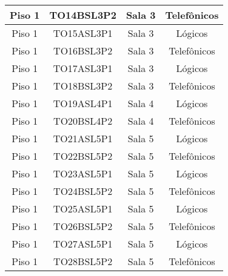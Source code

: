 \begin{table}[]
\begin{tabular}{cccc}
		Piso 1 & TO14BSL3P2                                                     & Sala 3         & Telefônicos        \\ \hline
		Piso 1 & TO15ASL3P1                                                     & Sala 3         & Lógicos            \\ \hline
		Piso 1 & TO16BSL3P2                                                     & Sala 3         & Telefônicos        \\ \hline
		Piso 1 & TO17ASL3P1                                                     & Sala 3         & Lógicos            \\ \hline
		Piso 1 & TO18BSL3P2                                                     & Sala 3         & Telefônicos        \\ \hline
		Piso 1 & TO19ASL4P1                                                     & Sala 4         & Lógicos            \\ \hline
		Piso 1 & TO20BSL4P2                                                     & Sala 4         & Telefônicos        \\ \hline
		Piso 1 & TO21ASL5P1                                                     & Sala 5         & Lógicos            \\ \hline
		Piso 1 & TO22BSL5P2                                                     & Sala 5         & Telefônicos        \\ \hline
		Piso 1 & TO23ASL5P1                                                     & Sala 5         & Lógicos            \\ \hline
		Piso 1 & TO24BSL5P2                                                     & Sala 5         & Telefônicos        \\ \hline
		Piso 1 & TO25ASL5P1                                                     & Sala 5         & Lógicos            \\ \hline
		Piso 1 & TO26BSL5P2                                                     & Sala 5         & Telefônicos        \\ \hline
		Piso 1 & TO27ASL5P1                                                     & Sala 5         & Lógicos            \\ \hline
		Piso 1 & TO28BSL5P2                                                     & Sala 5         & Telefônicos        \\ \hline
	\end{tabular}
\end{table}